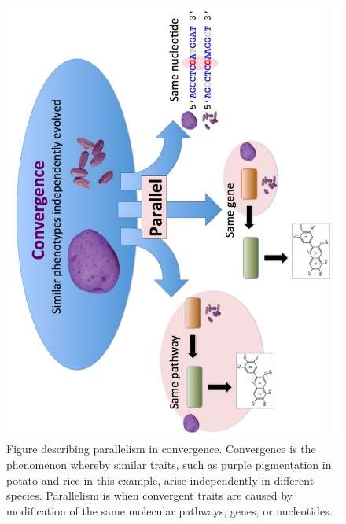 \documentclass[12pt]{article}
\begin{document}
\begin{figure}[h]
    \centering
    \includegraphics[width=15cm]{convergence_fig.pdf}
    \caption{Figure describing parallelism in convergence. Convergence is the phenomenon whereby similar traits, such as purple pigmentation in potato and rice in this example, arise independently in different species. Parallelism is when convergent traits are caused by modification of the same molecular pathways, genes, or nucleotides.
}
    \label{fig:convergence}
\end{figure}
\end{document}
